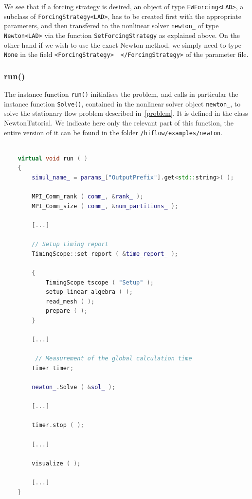 \documentclass[a4paper, 11pt, twoside]{article}
\begin{document}
We see that if a forcing strategy is desired, an object of type \verb+EWForcing<LAD>+, a subclass of \verb+ForcingStrategy<LAD>+, has to be created first with the appropriate parameters, and then transfered to the nonlinear solver \verb+newton_+ of type \verb+Newton<LAD>+ via the function \verb+SetForcingStrategy+ as explained above. On the other hand if we wish to use the exact Newton method, we simply need to type \verb+None+ in the field \verb+<ForcingStrategy>  </ForcingStrategy>+ of the parameter file.

\subsubsection{run()} \label{run}
The instance function \verb+run()+ initialises the problem, and calls in particular the instance function \verb+Solve()+, contained in the nonlinear solver object \verb+newton_+, to solve the stationary flow problem described in~\ref{problem}. It is defined in the class NewtonTutorial. We indicate here only the relevant part of this function, the entire version of it can be found in the folder \verb+/hiflow/examples/newton+.
\begin{lstlisting}[language=C++, basicstyle={\footnotesize, \ttfamily}, keywordstyle=\color{blue}, numbers=none, tabsize=4]

    virtual void run ( ) 
    {
        simul_name_ = params_["OutputPrefix"].get<std::string>( );

        MPI_Comm_rank ( comm_, &rank_ );
        MPI_Comm_size ( comm_, &num_partitions_ );

        [...]

        // Setup timing report
        TimingScope::set_report ( &time_report_ );

        {
            TimingScope tscope ( "Setup" );
            setup_linear_algebra ( );
            read_mesh ( );
            prepare ( );
        }

        [...]

         // Measurement of the global calculation time
        Timer timer;

        newton_.Solve ( &sol_ );
        
        [...]    

        timer.stop ( );

        [...]    

        visualize ( );

        [...]    
    }

\end{lstlisting}
\end{document}
